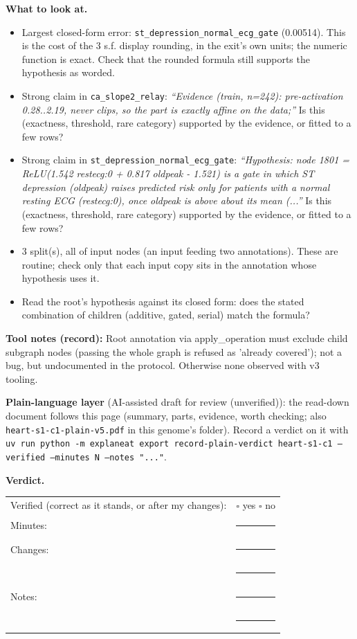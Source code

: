 \documentclass[a4paper,11pt]{article}
\begin{document}
\textbf{What to look at.}
\begin{itemize}
\item Largest closed-form error: \texttt{st\_\allowbreak{}depression\_\allowbreak{}normal\_\allowbreak{}ecg\_\allowbreak{}gate} (0.00514). This is the cost of the 3 s.f. display rounding, in the exit's own units; the numeric function is exact. Check that the rounded formula still supports the hypothesis as worded.
\item Strong claim in \texttt{ca\_\allowbreak{}slope2\_\allowbreak{}relay}: \emph{``Evidence (train, n=242): pre-activation 0.28..2.19, never clips, so the part is exactly affine on the data;''} Is this (exactness, threshold, rare category) supported by the evidence, or fitted to a few rows?
\item Strong claim in \texttt{st\_\allowbreak{}depression\_\allowbreak{}normal\_\allowbreak{}ecg\_\allowbreak{}gate}: \emph{``Hypothesis: node 1801 = ReLU(1.542 restecg:0 + 0.817 oldpeak - 1.521) is a gate in which ST depression (oldpeak) raises predicted risk only for patients with a normal resting ECG (restecg:0), once oldpeak is above about its mean (...''} Is this (exactness, threshold, rare category) supported by the evidence, or fitted to a few rows?
\item 3 split(s), all of input nodes (an input feeding two annotations). These are routine; check only that each input copy sits in the annotation whose hypothesis uses it.
\item Read the root's hypothesis against its closed form: does the stated combination of children (additive, gated, serial) match the formula?
\end{itemize}
\textbf{Tool notes (record):} Root annotation via apply\_\allowbreak{}operation must exclude child subgraph nodes (passing the whole graph is refused as 'already covered'); not a bug, but undocumented in the protocol. Otherwise none observed with v3 tooling.

\textbf{Plain-language layer} (AI-assisted draft for review (unverified)): the read-down document follows this page (summary, parts, evidence, worth checking; also \texttt{heart-s1-c1-plain-v5.pdf} in this genome's folder). Record a verdict on it with \texttt{uv run python -m explaneat export record-plain-verdict heart-s1-c1 --verified --minutes N --notes "..."}.

\textbf{Verdict.}

\begin{tabularx}{\linewidth}{@{}lX@{}}
Verified (correct as it stands, or after my changes): & $\square$ yes \quad $\square$ no \\[4pt]
Minutes: & \rule{3cm}{0.4pt} \\[4pt]
Changes: & \rule{\linewidth}{0.4pt} \\[10pt]
 & \rule{\linewidth}{0.4pt} \\[4pt]
Notes: & \rule{\linewidth}{0.4pt} \\[10pt]
 & \rule{\linewidth}{0.4pt} \\
\end{tabularx}
\end{document}
